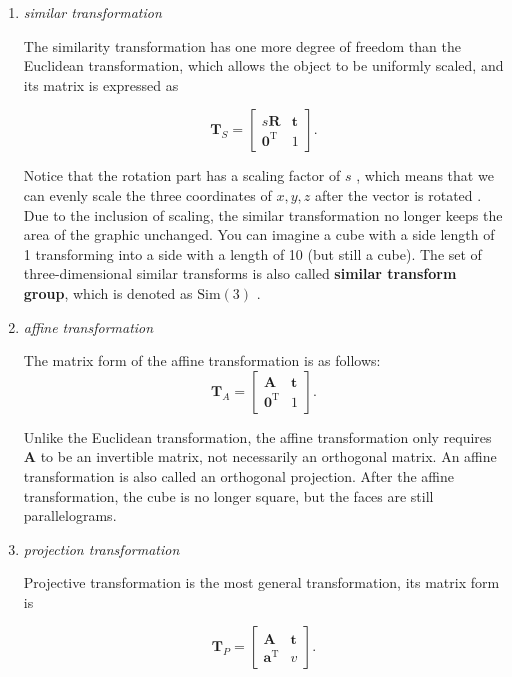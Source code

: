 \begin{enumerate}
	\item{ \emph{similar transformation} }
	
	The similarity transformation has one more degree of freedom than the Euclidean transformation, which allows the object to be uniformly scaled, and its matrix is expressed as
	
	\begin{equation}
	\bm{T}_S = \left[ {\begin{array}{*{20}{c}}
		{s \bm{R}}& \bm{t}\\
		{{ \bm{0}^\mathrm{T}}}&1
		\end{array}} \right].
	\end{equation}
	
	Notice that the rotation part has a scaling factor of $ s $ , which means that we can evenly scale the three coordinates of $ x, y, z $ after the vector is rotated . Due to the inclusion of scaling, the similar transformation no longer keeps the area of the graphic unchanged. You can imagine a cube with a side length of 1 transforming into a side with a length of 10 (but still a cube). The set of three-dimensional similar transforms is also called \textbf{similar transform group}, which is denoted as $ \mathrm {Sim}(3) $ .
	
	\item{ \emph{affine transformation} }
	
	The matrix form of the affine transformation is as follows:
	\begin{equation}
	\bm{T}_A = \left[ {\begin{array}{*{20}{c}}
		\bm{A} & \bm{t}\\
		{{\bm{0}^\mathrm{T}}} & 1
		\end{array}} \right].
	\end{equation}
	
	Unlike the Euclidean transformation, the affine transformation only requires $ \bm {A} $ to be an invertible matrix, not necessarily an orthogonal matrix. An affine transformation is also called an orthogonal projection. After the affine transformation, the cube is no longer square, but the faces are still parallelograms.
	
	\item{ \emph{projection transformation} }
	
	Projective transformation is the most general transformation, its matrix form is
	
	\begin{equation}
	{\bm{T}_P} = \left[ {\begin{array}{*{20}{c}}
		\bm{A} & \bm{t}\\
		{{\bm{a}^\mathrm{T}}} & v
		\end{array}} \right].
	\end{equation}
	

\end{enumerate}
